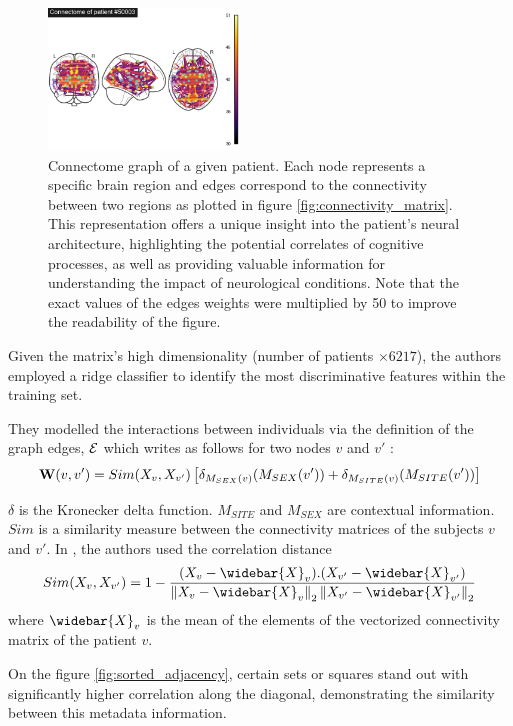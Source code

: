 \begin{figure}[h!]
    \centering
    \includegraphics[width=0.45\textwidth]{figures/ex_connectivity_pitt_ASD.png}
    \caption{Connectome graph of a given patient. Each node represents a specific brain region and edges correspond to the connectivity between two regions as plotted in figure \ref{fig:connectivity_matrix}. This representation offers a unique insight into the patient's neural architecture, highlighting the potential correlates of cognitive processes, as well as providing valuable information for understanding the impact of neurological conditions. Note that the exact values of the edges weights were multiplied by 50 to improve the readability of the figure.}
    \Description{}
    \label{fig:connectome}
\end{figure}

Given the matrix's high dimensionality (number of patients $\times 6217$), the authors employed a ridge classifier to identify the most discriminative features within the training set.

They modelled the interactions between individuals via the definition of the graph edges, $\mathcal{E}$ which writes as follows for two nodes $v$ and $v'$ :
$$ 
    \mathbf{W}(v, v') = Sim(X_v, X_{v'}) \left[\delta_{M_{SEX}(v)}(M_{SEX}(v')) + \delta_{M_{SITE}(v)}(M_{SITE}(v')) \right]
$$

$\delta$ is the Kronecker delta function.  $M_{SITE}$ and $M_{SEX}$ are contextual information. $Sim$ is a similarity measure between the connectivity matrices of the subjects $v$ and $v'$. In \cite{Parisot17}, the authors used the correlation distance 
$$
Sim(X_v, X_{v'}) =  1 - \frac{(X_v - \widebar{X}_v).(X_{v'} - \widebar{X}_{v'})}{\norm{X_v -\widebar{X}_{v}}_2\norm{X_{v'} - \widebar{X}_{v'}}_2}
$$
where $\widebar{X}_v$ is the mean of the elements of the vectorized connectivity matrix of the patient $v$. 

On the figure \ref{fig:sorted_adjacency}, certain sets or squares stand out with significantly higher correlation along the diagonal, demonstrating the similarity between this metadata information. 


